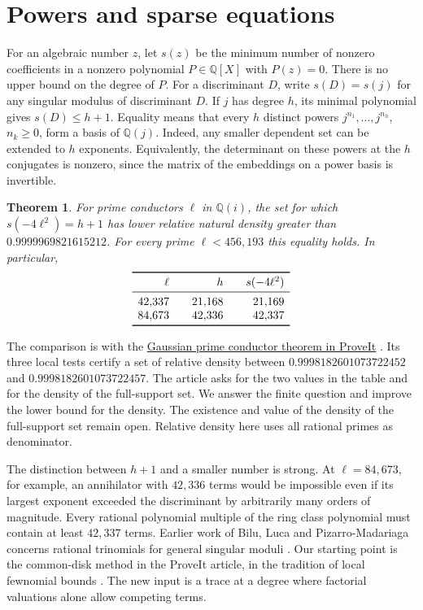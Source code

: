 \documentclass[11pt]{article}
\newtheorem{theorem}{Theorem}[section]
\newcommand{\Q}{\mathbb Q}
\newcommand{\repos}{https://github.com/VladimirReshetnikov/ProveIt/blob/497c1844e71393df41914f5b783d5dc9a618eb61/Analysis/GeneralizedRiemannHypothesis/Article/sections/smd.tex}
\begin{document}
\section{Powers and sparse equations}
For an algebraic number $z$, let $s(z)$ be the minimum number of nonzero coefficients in a nonzero polynomial $P\in\Q[X]$ with $P(z)=0$.
There is no upper bound on the degree of $P$. For a discriminant $D$, write $s(D)=s(j)$ for any singular modulus of discriminant $D$.
If $j$ has degree $h$, its minimal polynomial gives $s(D)\le h+1$.
Equality means that every $h$ distinct powers $j^{n_1},\ldots,j^{n_h}$, $n_k\ge0$, form a basis of $\Q(j)$.
Indeed, any smaller dependent set can be extended to $h$ exponents. Equivalently, the determinant on these powers at the $h$ conjugates is nonzero, since the matrix of the embeddings on a power basis is invertible.
\begin{theorem}\label{thm:main}
For prime conductors $\ell$ in $\Q(i)$, the set for which $s(-4\ell^2)=h+1$ has lower relative natural density greater than
$0.9999969821615212$. For every prime $\ell<456{,}193$ this equality holds. In particular,
\[
\begin{array}{r@{\qquad}r@{\qquad}r}
\toprule
\ell &h&s(-4\ell^2)\\\midrule
42{,}337&21{,}168&21{,}169\\
84{,}673&42{,}336&42{,}337\\\bottomrule
\end{array}
\]
\end{theorem}
The comparison is with the \href{\repos}{Gaussian prime conductor theorem in ProveIt} \cite{repo}. Its three local tests certify a set of relative density between $0.9998182601073722452$ and $0.9998182601073722457$. The article asks for the two values in the table and for the density of the full-support set. We answer the finite question and improve the lower bound for the density. The existence and value of the density of the full-support set remain open. Relative density here uses all rational primes as denominator.

The distinction between $h+1$ and a smaller number is strong. At $\ell=84{,}673$, for example, an annihilator with $42{,}336$ terms would be impossible even if its largest exponent exceeded the discriminant by arbitrarily many orders of magnitude. Every rational polynomial multiple of the ring class polynomial must contain at least $42{,}337$ terms. Earlier work of Bilu, Luca and Pizarro-Madariaga concerns rational trinomials for general singular moduli \cite{blp}. Our starting point is the common-disk method in the ProveIt article, in the tradition of local fewnomial bounds \cite{ak}. The new input is a trace at a degree where factorial valuations alone allow competing terms.
\end{document}
